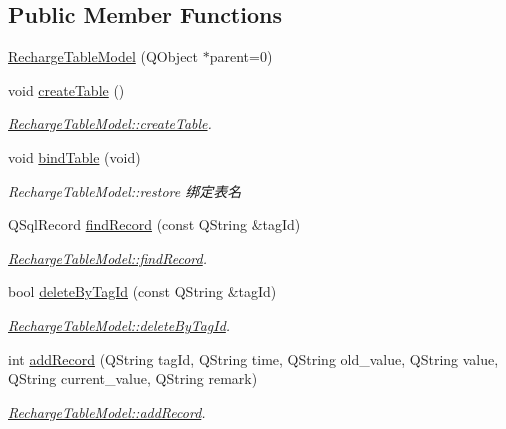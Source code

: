 \subsection*{Public Member Functions}
\begin{DoxyCompactItemize}
\item 
\mbox{\hyperlink{class_recharge_table_model_a62106e9be4a9d706aa0ee3ad265099d0}{Recharge\+Table\+Model}} (Q\+Object $\ast$parent=0)
\item 
void \mbox{\hyperlink{class_recharge_table_model_abf3ad9d708cfff7bbbc94e247b0bb508}{create\+Table}} ()
\begin{DoxyCompactList}\small\item\em \mbox{\hyperlink{class_recharge_table_model_abf3ad9d708cfff7bbbc94e247b0bb508}{Recharge\+Table\+Model\+::create\+Table}}. \end{DoxyCompactList}\item 
void \mbox{\hyperlink{class_recharge_table_model_a0747bbbc51e5061dad46178edfae4d85}{bind\+Table}} (void)
\begin{DoxyCompactList}\small\item\em Recharge\+Table\+Model\+::restore 绑定表名 \end{DoxyCompactList}\item 
Q\+Sql\+Record \mbox{\hyperlink{class_recharge_table_model_a3ed6573e99f35f145d017a7adc89b5cc}{find\+Record}} (const Q\+String \&tag\+Id)
\begin{DoxyCompactList}\small\item\em \mbox{\hyperlink{class_recharge_table_model_a3ed6573e99f35f145d017a7adc89b5cc}{Recharge\+Table\+Model\+::find\+Record}}. \end{DoxyCompactList}\item 
bool \mbox{\hyperlink{class_recharge_table_model_a184459df461ce60d8f8d1874a23ff3d8}{delete\+By\+Tag\+Id}} (const Q\+String \&tag\+Id)
\begin{DoxyCompactList}\small\item\em \mbox{\hyperlink{class_recharge_table_model_a184459df461ce60d8f8d1874a23ff3d8}{Recharge\+Table\+Model\+::delete\+By\+Tag\+Id}}. \end{DoxyCompactList}\item 
int \mbox{\hyperlink{class_recharge_table_model_a3717a682f1efe46f47cd2101cef9a467}{add\+Record}} (Q\+String tag\+Id, Q\+String time, Q\+String old\+\_\+value, Q\+String value, Q\+String current\+\_\+value, Q\+String remark)
\begin{DoxyCompactList}\small\item\em \mbox{\hyperlink{class_recharge_table_model_a3717a682f1efe46f47cd2101cef9a467}{Recharge\+Table\+Model\+::add\+Record}}. \end{DoxyCompactList}\end{DoxyCompactItemize}
